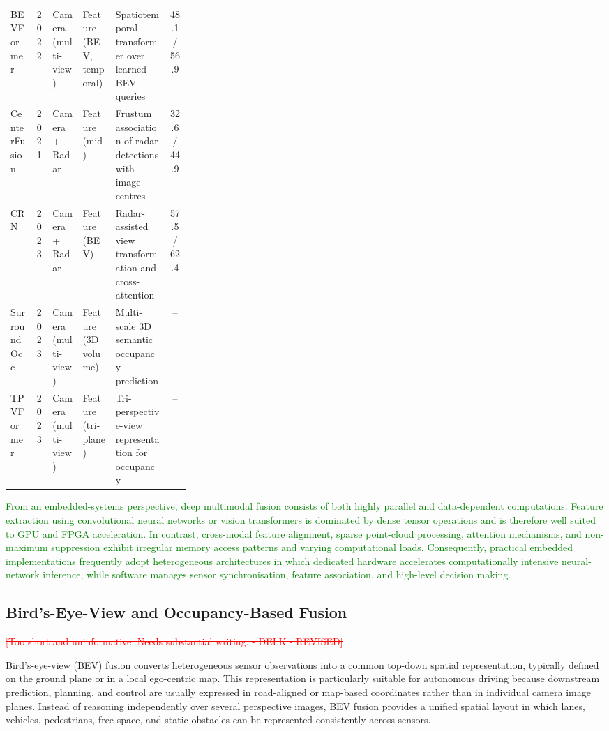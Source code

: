 \documentclass{ieeeaccess}
\newcommand{\deleted}[1]{\textcolor{red}{\sout{#1}}}
\begin{document}
\begin{table}[!t]
\begin{tabular}{l c l l p{0.30\linewidth} c}
        BEVFormer \cite{li2022_bevformer} & 2022 & Camera (multi-view) & Feature (BEV, temporal) & Spatiotemporal transformer over learned BEV queries & 48.1 / 56.9 \\
        CenterFusion \cite{nabati2021_centerfusion} & 2021 & Camera + Radar & Feature (mid) & Frustum association of radar detections with image centres & 32.6 / 44.9 \\
        CRN \cite{kim2023_crn} & 2023 & Camera + Radar & Feature (BEV) & Radar-assisted view transformation and cross-attention & 57.5 / 62.4 \\
        SurroundOcc \cite{wei2023_surroundocc} & 2023 & Camera (multi-view) & Feature (3D volume) & Multi-scale 3D semantic occupancy prediction & -- \\
        TPVFormer \cite{huang2023_tpvformer} & 2023 & Camera (multi-view) & Feature (tri-plane) & Tri-perspective-view representation for occupancy & -- \\
        \hline
    \end{tabular}
\end{table}

\textcolor{green}{
From an embedded-systems perspective, deep multimodal fusion consists of both highly parallel and data-dependent computations. Feature extraction using convolutional neural networks or vision transformers is dominated by dense tensor operations and is therefore well suited to GPU and FPGA acceleration. In contrast, cross-modal feature alignment, sparse point-cloud processing, attention mechanisms, and non-maximum suppression exhibit irregular memory access patterns and varying computational loads. Consequently, practical embedded implementations frequently adopt heterogeneous architectures in which dedicated hardware accelerates computationally intensive neural-network inference, while software manages sensor synchronisation, feature association, and high-level decision making.
}

\subsection{Bird's-Eye-View and Occupancy-Based Fusion}

\deleted{[Too short and uninformative. Needs substantial writing. - DELK - REVISED]}

Bird's-eye-view (BEV) fusion converts heterogeneous sensor observations into a common top-down spatial representation, typically defined on the ground plane or in a local ego-centric map. This representation is particularly suitable for autonomous driving because downstream prediction, planning, and control are usually expressed in road-aligned or map-based coordinates rather than in individual camera image planes. Instead of reasoning independently over several perspective images, BEV fusion provides a unified spatial layout in which lanes, vehicles, pedestrians, free space, and static obstacles can be represented consistently across sensors.
\end{document}
